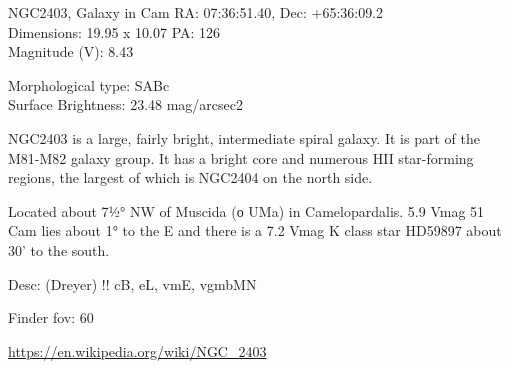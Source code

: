 \begin{block}{NGC2403, Galaxy in Cam}
    RA: 07:36:51.40, Dec: +65:36:09.2 \\ 
    Dimensions: 19.95 x 10.07 PA: 126 \\ 
    Magnitude (V): 8.43

    Morphological type: SABc \\ 
    Surface Brightness: 23.48 mag/arcsec2 

    NGC2403 is a large, fairly bright, intermediate spiral galaxy. It is part
    of the M81-M82 galaxy group. It has a bright core and numerous HII
    star-forming regions, the largest of which is NGC2404 on the north side.

    Located about 7½° NW of Muscida (ο UMa) in Camelopardalis. 5.9 Vmag 51 Cam
    lies about 1° to the E and there is a 7.2 Vmag K class star HD59897 about 30'
    to the south. 

    Desc: (Dreyer) !! cB, eL, vmE, vgmbMN 

    Finder fov: 60 

    \url{https://en.wikipedia.org/wiki/NGC_2403} 
\end{block}
